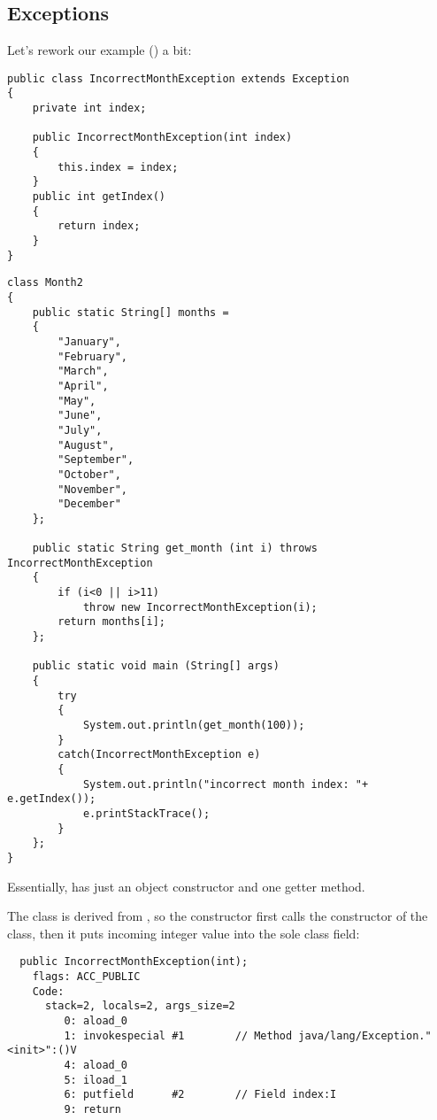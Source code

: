 \subsection{Exceptions}

Let's rework our  example () a bit:

\begin{lstlisting}[caption=IncorrectMonthException.java,style=customjava]
public class IncorrectMonthException extends Exception
{
	private int index;

	public IncorrectMonthException(int index)
	{
		this.index = index;
	} 
	public int getIndex()
	{
		return index;
	}
}
\end{lstlisting}

\begin{lstlisting}[caption=Month2.java,style=customjava]
class Month2
{
	public static String[] months = 
	{
		"January", 
		"February", 
		"March", 
		"April",
		"May",
		"June",
		"July",
		"August",
		"September",
		"October",
		"November",
		"December"
	};

	public static String get_month (int i) throws IncorrectMonthException
	{
		if (i<0 || i>11)
			throw new IncorrectMonthException(i);
		return months[i];
	};

	public static void main (String[] args)
	{
		try
		{
			System.out.println(get_month(100));
		}
		catch(IncorrectMonthException e)
		{
			System.out.println("incorrect month index: "+ e.getIndex());
			e.printStackTrace();
		}
	};
}
\end{lstlisting}

Essentially,  has just an object constructor 
and one getter method.

The  class is derived from , 
so the  constructor
first calls the constructor of the  class, 
then it puts incoming integer value into the sole  class field:

\begin{lstlisting}
  public IncorrectMonthException(int);
    flags: ACC_PUBLIC
    Code:
      stack=2, locals=2, args_size=2
         0: aload_0       
         1: invokespecial #1        // Method java/lang/Exception."<init>":()V
         4: aload_0       
         5: iload_1       
         6: putfield      #2        // Field index:I
         9: return        
\end{lstlisting}

